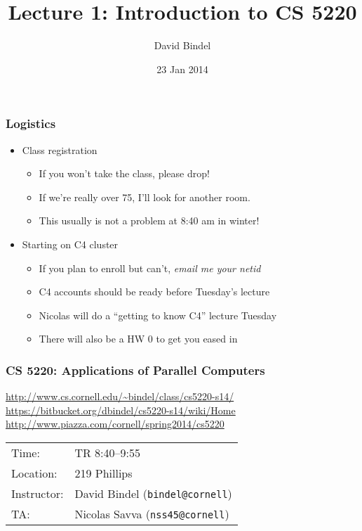 \documentclass{beamer}
\title[CS 5220, Spring 2014]{Lecture 1: Introduction to CS 5220}
\author[]{David Bindel}
\date[]{23 Jan 2014}
\begin{document}
\begin{frame}
  \titlepage
\end{frame}

\begin{frame}
  \frametitle{Logistics}

  \begin{itemize}
  \item Class registration
    \begin{itemize}
    \item If you won't take the class, please drop!
    \item If we're really over 75, I'll look for another room.
    \item This usually is not a problem at 8:40 am in winter!
    \end{itemize}
  \item Starting on C4 cluster
    \begin{itemize}
    \item If you plan to enroll but can't, {\em email me your netid}
    \item C4 accounts should be ready before Tuesday's lecture
    \item Nicolas will do a ``getting to know C4'' lecture Tuesday
    \item There will also be a HW 0 to get you eased in
    \end{itemize}
  \end{itemize}
\end{frame}

\begin{frame}
  \frametitle{CS 5220: Applications of Parallel Computers}

  \begin{center}
  {\small \url{http://www.cs.cornell.edu/~bindel/class/cs5220-s14/}} \\
  {\small \url{https://bitbucket.org/dbindel/cs5220-s14/wiki/Home}} \\
  {\small \url{http://www.piazza.com/cornell/spring2014/cs5220}} \\[1cm]
  \begin{tabular}{ll}
  Time:         &  TR 8:40--9:55 \\
  Location:     & 219 Phillips \\
  Instructor:   & David Bindel ({\tt bindel@cornell}) \\
  TA:           & Nicolas Savva ({\tt nss45@cornell})
  \end{tabular}
  \end{center}
  
\end{frame}
\end{document}
